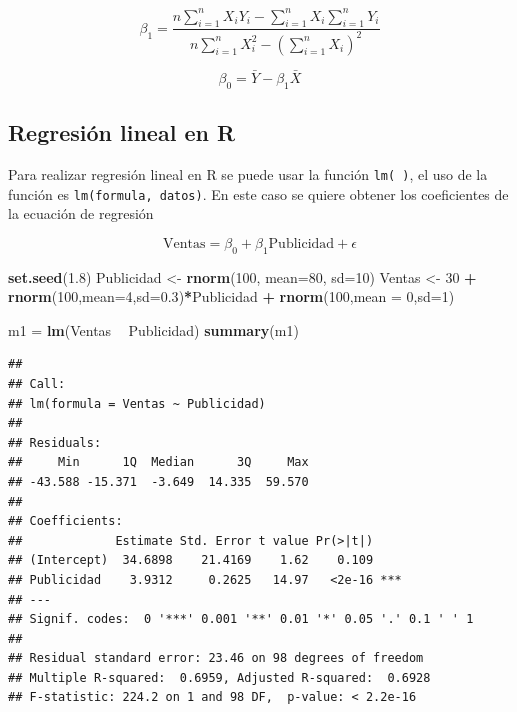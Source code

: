 \documentclass[
]{krantz}
\makeatletter
\newenvironment{Shaded}{\begin{snugshade}}{\end{snugshade}}
\newcommand{\DataTypeTok}[1]{\textcolor[rgb]{0.27,0.27,0.27}{#1}}
\newcommand{\DecValTok}[1]{\textcolor[rgb]{0.06,0.06,0.06}{#1}}
\newcommand{\FloatTok}[1]{\textcolor[rgb]{0.06,0.06,0.06}{#1}}
\newcommand{\KeywordTok}[1]{\textcolor[rgb]{0.27,0.27,0.27}{\textbf{#1}}}
\newcommand{\NormalTok}[1]{#1}
\newcommand{\OperatorTok}[1]{\textcolor[rgb]{0.43,0.43,0.43}{\textbf{#1}}}
\newcommand{\StringTok}[1]{\textcolor[rgb]{0.5,0.5,0.5}{#1}}
\newenvironment{kframe}{%
\medskip{}
\setlength{\fboxsep}{.8em}
 \def\at@end@of@kframe{}%
 \ifinner\ifhmode%
  \def\at@end@of@kframe{\end{minipage}}%
  \begin{minipage}{\columnwidth}%
 \fi\fi%
 \def\FrameCommand##1{\hskip\@totalleftmargin \hskip-\fboxsep
 \colorbox{shadecolor}{##1}\hskip-\fboxsep
     \hskip-\linewidth \hskip-\@totalleftmargin \hskip\columnwidth}%
 \MakeFramed {\advance\hsize-\width
   \@totalleftmargin\z@ \linewidth\hsize
   \@setminipage}}%
 {\par\unskip\endMakeFramed%
 \at@end@of@kframe}
\renewenvironment{Shaded}{\begin{kframe}}{\end{kframe}}
\makeatother
\begin{document}
\begin{equation}
\beta_1 = \dfrac{n\sum_{i=1}^{n}{X_iY_i}-\sum_{i=1}^{n}{X_i}\sum_{i=1}^{n}{Y_i}}{n\sum_{i=1}^{n}{X_i^2}-\left(\sum_{i=1}^{n}{X_i}\right)^2}
    \label{eq:pendiente}
\end{equation}

\begin{equation}
\beta_0 = \bar{Y}-\beta_1\bar{X}
    \label{eq:inter}
\end{equation}

\hypertarget{regresion-lineal-en-r}{%
\subsection{Regresión lineal en R}\label{regresion-lineal-en-r}}

Para realizar regresión lineal en R se puede usar la función \texttt{lm(\ )}, el uso de la función es \texttt{lm(formula,\ datos)}. En este caso se quiere obtener los coeficientes de la ecuación de regresión

\begin{equation}
  \text{Ventas} = \beta_0 + \beta_1 \text{Publicidad} + \epsilon
    \label{eq:modelo0}
\end{equation}

\begin{Shaded}
\begin{Highlighting}[]
\KeywordTok{set.seed}\NormalTok{(}\FloatTok{1.8}\NormalTok{)}
\NormalTok{Publicidad <-}\StringTok{ }\KeywordTok{rnorm}\NormalTok{(}\DecValTok{100}\NormalTok{, }\DataTypeTok{mean=}\DecValTok{80}\NormalTok{, }\DataTypeTok{sd=}\DecValTok{10}\NormalTok{)}
\NormalTok{Ventas <-}\StringTok{ }\DecValTok{30} \OperatorTok{+}\StringTok{ }\KeywordTok{rnorm}\NormalTok{(}\DecValTok{100}\NormalTok{,}\DataTypeTok{mean=}\DecValTok{4}\NormalTok{,}\DataTypeTok{sd=}\FloatTok{0.3}\NormalTok{)}\OperatorTok{*}\NormalTok{Publicidad }\OperatorTok{+}\StringTok{ }\KeywordTok{rnorm}\NormalTok{(}\DecValTok{100}\NormalTok{,}\DataTypeTok{mean =} \DecValTok{0}\NormalTok{,}\DataTypeTok{sd=}\DecValTok{1}\NormalTok{)}

\NormalTok{m1 =}\StringTok{ }\KeywordTok{lm}\NormalTok{(Ventas }\OperatorTok{~}\StringTok{ }\NormalTok{Publicidad)}
\KeywordTok{summary}\NormalTok{(m1)}
\end{Highlighting}
\end{Shaded}

\begin{verbatim}
## 
## Call:
## lm(formula = Ventas ~ Publicidad)
## 
## Residuals:
##     Min      1Q  Median      3Q     Max 
## -43.588 -15.371  -3.649  14.335  59.570 
## 
## Coefficients:
##             Estimate Std. Error t value Pr(>|t|)    
## (Intercept)  34.6898    21.4169    1.62    0.109    
## Publicidad    3.9312     0.2625   14.97   <2e-16 ***
## ---
## Signif. codes:  0 '***' 0.001 '**' 0.01 '*' 0.05 '.' 0.1 ' ' 1
## 
## Residual standard error: 23.46 on 98 degrees of freedom
## Multiple R-squared:  0.6959, Adjusted R-squared:  0.6928 
## F-statistic: 224.2 on 1 and 98 DF,  p-value: < 2.2e-16
\end{verbatim}
\end{document}
